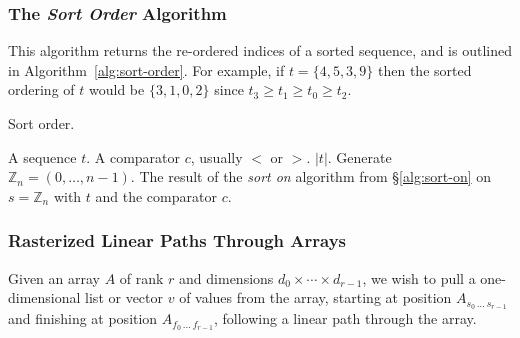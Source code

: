 \subsubsection{The \emph{Sort Order} Algorithm}
This algorithm returns the re-ordered indices of a sorted sequence, and is outlined in Algorithm~\ref{alg:sort-order}.
For example, if $t = \{4,5,3,9\}$
then the sorted ordering of $t$ would be $\{3,1,0,2\}$
since $t_3 \ge t_1 \ge t_0 \ge t_2$.
\begin{algorithm}[H]
\caption{Sort order.}
\label{alg:sort-order}
\begin{algorithmic}[1]
\INPUT A sequence $t$.
\INPUT A comparator $c$, usually $<$ or $>$.
 $|t|$.
\STATE Generate $\mathbb{Z}_n = (0, \ldots, n-1)$.
\RETURN The result of the \emph{sort on} algorithm from \S\ref{alg:sort-on} on $s = \mathbb{Z}_n$ with $t$ and the comparator $c$.
\end{algorithmic}
\end{algorithm}


\subsubsection{Rasterized Linear Paths Through Arrays}
Given an array $A$ of rank $r$ and dimensions
$d_0 \times \cdots \times d_{r-1}$,
we wish to pull a one-dimensional list or vector $v$ of values from the array, starting at position
$A_{s_0\,\ldots\,s_{r-1}}$
and finishing at position
$A_{f_0\,\ldots\,f_{r-1}}$,
following a linear path through the array.

